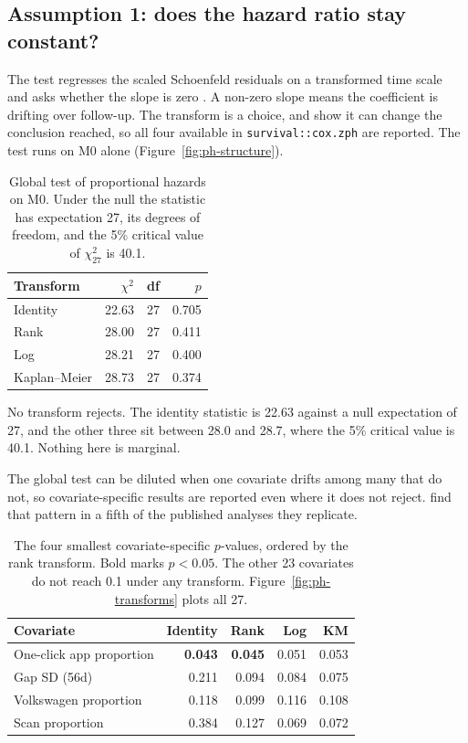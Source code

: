 \subsection{Assumption 1: does the hazard ratio stay constant?}
\label{subsec:res-ph}
 
The test regresses the scaled Schoenfeld residuals on a transformed time scale and asks whether the slope is zero \parencite{grambsch1994}. A non-zero slope means the coefficient is drifting over follow-up. The transform is a choice, and \textcite{park2015} show it can change the conclusion reached, so all four available in \texttt{survival::cox.zph} are reported. The test runs on M0 alone (Figure~\ref{fig:ph-structure}).
 
\begin{table}[htbp]
\centering
\small
\begin{tabular}{@{}lrrr@{}}
\toprule
Transform & $\chi^2$ & df & $p$ \\
\midrule
Identity      & 22.63 & 27 & 0.705 \\
Rank          & 28.00 & 27 & 0.411 \\
Log           & 28.21 & 27 & 0.400 \\
Kaplan--Meier & 28.73 & 27 & 0.374 \\
\bottomrule
\end{tabular}
\caption{Global test of proportional hazards on M0. Under the null the statistic has expectation 27, its degrees of freedom, and the 5\% critical value of $\chi^2_{27}$ is 40.1.}
\label{tab:zph-global}
\end{table}
 
No transform rejects. The identity statistic is 22.63 against a null expectation of 27, and the other three sit between 28.0 and 28.7, where the 5\% critical value is 40.1. Nothing here is marginal.
 
The global test can be diluted when one covariate drifts among many that do not, so covariate-specific results are reported even where it does not reject. \textcite[p.~16]{park2015} find that pattern in a fifth of the published analyses they replicate. %
 
\begin{table}[htbp]
\centering
\small
\begin{tabular}{@{}lrrrr@{}}
\toprule
Covariate & Identity & Rank & Log & KM \\
\midrule
One-click app proportion & \textbf{0.043} & \textbf{0.045} & 0.051 & 0.053 \\
Gap SD (56d)             & 0.211 & 0.094 & 0.084 & 0.075 \\
Volkswagen proportion    & 0.118 & 0.099 & 0.116 & 0.108 \\
Scan proportion          & 0.384 & 0.127 & 0.069 & 0.072 \\
\bottomrule
\end{tabular}
\caption{The four smallest covariate-specific $p$-values, ordered by the rank transform. Bold marks $p<0.05$. The other 23 covariates do not reach 0.1 under any transform. Figure~\ref{fig:ph-transforms} plots all 27.}
\label{tab:zph-covariate}
\end{table}
 
